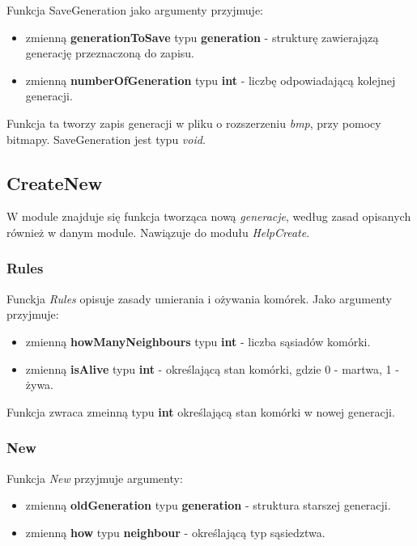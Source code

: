 \documentclass[a4paper]{article}
\begin{document}
\quad Funkcja SaveGeneration jako argumenty przyjmuje:

\begin{itemize}
	\item zmienn\k{a} \textbf{generationToSave} typu \textbf{generation} - struktur\k{e} zawieraj\k{a}z\k{a} generacj\k{e} przeznaczon\k{a} do zapisu.
	\item zmienn\k{a} \textbf{numberOfGeneration} typu \textbf{int} - liczb\k{e} odpowiadaj\k{a}c\k{a} kolejnej generacji.
\end{itemize}

\quad Funkcja ta tworzy zapis generacji w pliku o rozszerzeniu \textit{bmp}, przy pomocy bitmapy.
SaveGeneration jest typu \textit{void}.


\subsection{CreateNew}

\quad W module znajduje si\k{e} funkcja tworz\k{a}ca now\k{a} \textit{generacje}, wed\l{}ug zasad opisanych r\'ownie\.z w danym module.
Nawi\k{a}zuje do modu\l{}u \textit{HelpCreate}.

\subsubsection{Rules}

\quad Funckja \textit{Rules} opisuje zasady umierania i o\.zywania kom\'orek. 
Jako argumenty przyjmuje:

\begin{itemize}
	\item zmienn\k{a} \textbf{howManyNeighbours} typu \textbf{int} - liczba s\k{a}siad\'ow kom\'orki.
	\item zmienn\k{a} \textbf{isAlive} typu \textbf{int} - okre\'slaj\k{a}c\k{a} stan kom\'orki, gdzie 0 - martwa, 1 - \.zywa.
\end{itemize}

\quad Funkcja zwraca zmeinn\k{a} typu \textbf{int} okre\'slaj\k{a}c\k{a} stan kom\'orki w nowej generacji.


\subsubsection{New}

\quad Funkcja \textit{New} przyjmuje argumenty:

\begin{itemize}
        \item zmienn\k{a} \textbf{oldGeneration} typu \textbf{generation} - struktura starszej generacji.
	\item zmienn\k{a} \textbf{how} typu \textbf{neighbour} - okre\'slaj\k{a}c\k{a} typ s\k{a}siedztwa.
\end{itemize}
\end{document}
